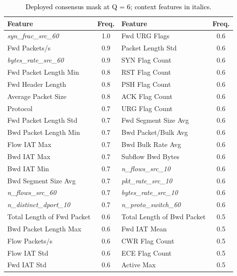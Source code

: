 \documentclass[conference]{IEEEtran}
\begin{document}
\begin{table}[!t]
\centering
\scriptsize
\caption{\textcolor{black}{Deployed consensus mask at Q = 6; context features in italics.}}
\label{tab:selected_features}
\setlength{\tabcolsep}{2.5pt}
\renewcommand{\arraystretch}{1.02}
\begin{tabular}{>{\raggedright\arraybackslash}p{3.0cm}c >{\raggedright\arraybackslash}p{3.0cm}c}
\hline\toprule
Feature & Freq. & Feature & Freq. \\
\hline\toprule
\textit{syn\_frac\_src\_60} & 1.0 & Fwd URG Flags & 0.6 \\
Fwd Packets/\allowbreak s & 0.9 & Packet Length Std & 0.6 \\
\textit{bytes\_rate\_src\_60} & 0.9 & SYN Flag Count & 0.6 \\
Fwd Packet Length Min & 0.8 & RST Flag Count & 0.6 \\
Fwd Header Length & 0.8 & PSH Flag Count & 0.6 \\
Average Packet Size & 0.8 & ACK Flag Count & 0.6 \\
Protocol & 0.7 & URG Flag Count & 0.6 \\
Fwd Packet Length Std & 0.7 & Fwd Segment Size Avg & 0.6 \\
Bwd Packet Length Min & 0.7 & Bwd Packet/\allowbreak Bulk Avg & 0.6 \\
Flow IAT Max & 0.7 & Bwd Bulk Rate Avg & 0.6 \\
Bwd IAT Max & 0.7 & Subflow Bwd Bytes & 0.6 \\
Bwd IAT Min & 0.7 & \textit{n\_flows\_src\_10} & 0.6 \\
Bwd Segment Size Avg & 0.7 & \textit{pkt\_rate\_src\_10} & 0.6 \\
\textit{n\_flows\_src\_60} & 0.7 & \textit{bytes\_rate\_src\_10} & 0.6 \\
\textit{n\_distinct\_dport\_10} & 0.7 & \textit{n\_proto\_switch\_60} & 0.6 \\
Total Length of Fwd Packet & 0.6 & Total Length of Bwd Packet & 0.5 \\
Bwd Packet Length Max & 0.6 & Fwd IAT Mean & 0.5 \\
Flow Packets/\allowbreak s & 0.6 & CWR Flag Count & 0.5 \\
Flow IAT Std & 0.6 & ECE Flag Count & 0.5 \\
Fwd IAT Std & 0.6 & Active Max & 0.5 \\
\hline\toprule
\end{tabular}
\end{table}
\end{document}
